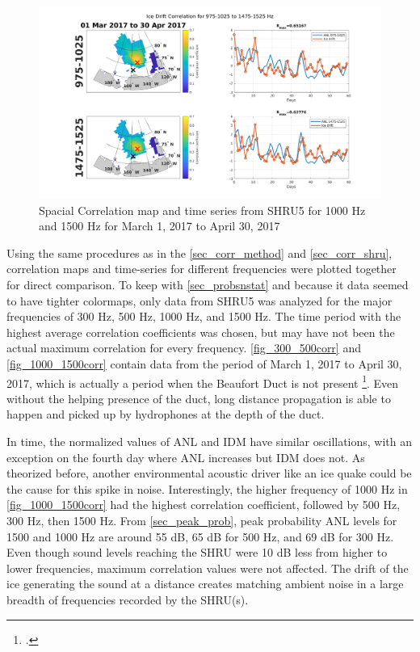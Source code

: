 \begin{figure}[p]
\centering
\includegraphics[scale=0.35]{Figures/1000_1500_spatial_corr_20170301-20170430.png}
\caption{Spacial Correlation map and time series from SHRU5 for 1000 Hz and 1500 Hz for March 1, 2017 to April 30, 2017}
\label{fig_1000_1500corr}
\end{figure}

Using the same procedures as in the \autoref{sec_corr_method} and \autoref{sec_corr_shru}, correlation maps and time-series for different frequencies were plotted together for direct comparison. To keep with \autoref{sec_probsnstat} and because it data seemed to have tighter colormaps, only data from SHRU5 was analyzed for the major frequencies of 300 Hz, 500 Hz, 1000 Hz, and 1500 Hz. The time period with the highest average correlation coefficients was chosen, but may have not been the actual maximum correlation for every frequency. \autoref{fig_300_500corr} and \autoref{fig_1000_1500corr} contain data from the period of March 1, 2017 to April 30, 2017, which is actually a period when the Beaufort Duct is not present \footcite[]{ballard2020yearlong}. Even without the helping presence of the duct, long distance propagation is able to happen and picked up by hydrophones at the depth of the duct. 

In time, the normalized values of ANL and IDM have similar oscillations, with an exception on the fourth day where ANL increases but IDM does not. As theorized before, another environmental acoustic driver like an ice quake could be the cause for this spike in noise. Interestingly, the higher frequency of 1000 Hz in \autoref{fig_1000_1500corr} had the highest correlation coefficient, followed by 500 Hz, 300 Hz, then 1500 Hz. From \autoref{sec_peak_prob}, peak probability ANL levels for 1500 and 1000 Hz are around 55 dB, 65 dB for 500 Hz, and 69 dB for 300 Hz. Even though sound levels reaching the SHRU were 10 dB less from higher to lower frequencies, maximum correlation values were not affected. The drift of the ice generating the sound at a distance creates matching ambient noise in a large breadth of frequencies recorded by the SHRU(s). 

